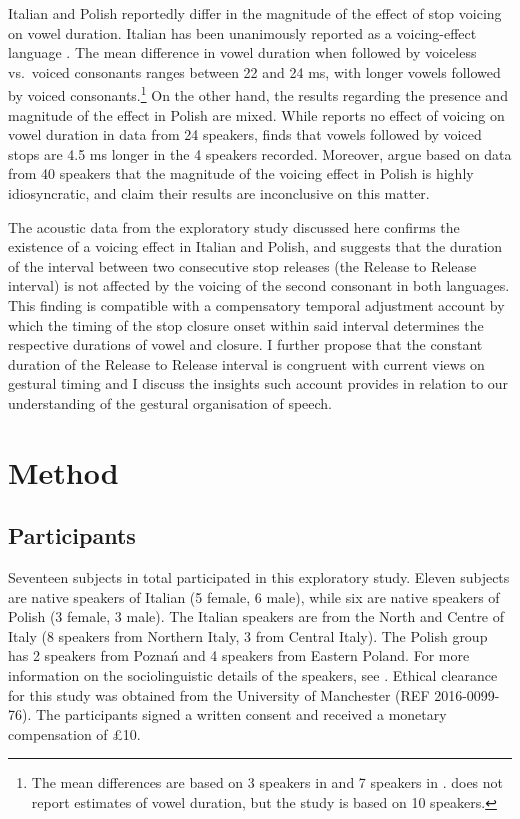 \documentclass[preprint]{JASAnew}
\begin{document}
Italian and Polish reportedly differ in the magnitude of the effect of
stop voicing on vowel duration. Italian has been unanimously reported as
a voicing-effect language
\citep{caldognetto1979, farnetani1986, esposito2002}. The mean
difference in vowel duration when followed by voiceless vs.~voiced
consonants ranges between 22 and 24 ms, with longer vowels followed by
voiced
consonants.\footnote{The mean differences are based on 3 speakers in \citealt{farnetani1986} and 7 speakers in \citealt{esposito2002}. \citealt{caldognetto1979} does not report estimates of vowel duration, but the study is based on 10 speakers.}
On the other hand, the results regarding the presence and magnitude of
the effect in Polish are mixed. While \citet{keating1984} reports no
effect of voicing on vowel duration in data from 24 speakers,
\citet{nowak2006} finds that vowels followed by voiced stops are 4.5 ms
longer in the 4 speakers recorded. Moreover, \citet{malisz2008} argue
based on data from 40 speakers that the magnitude of the voicing effect
in Polish is highly idiosyncratic, and claim their results are
inconclusive on this matter.

The acoustic data from the exploratory study discussed here confirms the
existence of a voicing effect in Italian and Polish, and suggests that
the duration of the interval between two consecutive stop releases (the
Release to Release interval) is not affected by the voicing of the
second consonant in both languages. This finding is compatible with a
compensatory temporal adjustment account by which the timing of the stop
closure onset within said interval determines the respective durations
of vowel and closure. I further propose that the constant duration of
the Release to Release interval is congruent with current views on
gestural timing \citep{goldstein2014} and I discuss the insights such
account provides in relation to our understanding of the gestural
organisation of speech.

\hypertarget{method}{%
\section{Method}\label{method}}

\label{s:method}

\hypertarget{participants}{%
\subsection{Participants}\label{participants}}

Seventeen subjects in total participated in this exploratory study.
Eleven subjects are native speakers of Italian (5 female, 6 male), while
six are native speakers of Polish (3 female, 3 male). The Italian
speakers are from the North and Centre of Italy (8 speakers from
Northern Italy, 3 from Central Italy). The Polish group has 2 speakers
from Poznań and 4 speakers from Eastern Poland. For more information on
the sociolinguistic details of the speakers, see .
Ethical clearance for this study was obtained from the University of
Manchester (REF 2016-0099-76). The participants signed a written consent
and received a monetary compensation of £10.
\end{document}
